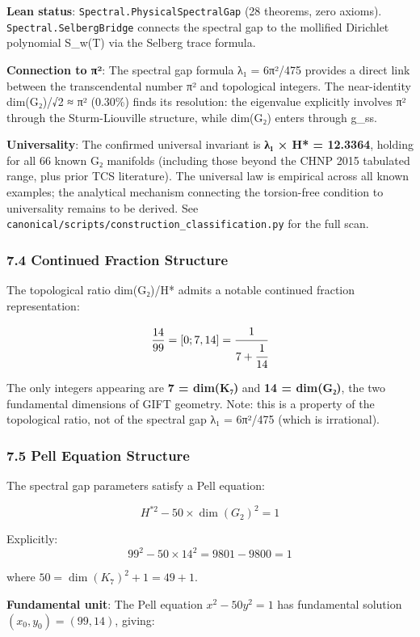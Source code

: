 \documentclass[11pt,a4paper]{article}
\begin{document}
{{{{{{{{{{{{{{{\textbf{Lean status}: \texttt{Spectral.PhysicalSpectralGap} (28 theorems, zero axioms). \texttt{Spectral.SelbergBridge} connects the spectral gap to the mollified Dirichlet polynomial S\_w(T) via the Selberg trace formula.

\textbf{Connection to π²}: The spectral gap formula λ₁ = 6π²/475 provides a direct link between the transcendental number π² and topological integers. The near-identity dim(G₂)/√2 ≈ π² (0.30\%) finds its resolution: the eigenvalue explicitly involves π² through the Sturm-Liouville structure, while dim(G₂) enters through g\_ss.

\textbf{Universality}: The confirmed universal invariant is \textbf{λ₁ × H* = 12.3364}, holding for all 66 known G₂ manifolds (including those beyond the CHNP 2015 tabulated range, plus prior TCS literature). The universal law is empirical across all known examples; the analytical mechanism connecting the torsion-free condition to universality remains to be derived. See \texttt{canonical/scripts/construction\_classification.py} for the full scan.

\subsubsection{7.4 Continued Fraction Structure}\label{continued-fraction-structure}

The topological ratio dim(G₂)/H* admits a notable continued fraction representation:

\[\frac{14}{99} = [0; 7, 14] = \cfrac{1}{7 + \cfrac{1}{14}}\]

The only integers appearing are \textbf{7 = dim(K₇)} and \textbf{14 = dim(G₂)}, the two fundamental dimensions of GIFT geometry. Note: this is a property of the topological ratio, not of the spectral gap λ₁ = 6π²/475 (which is irrational).

\subsubsection{7.5 Pell Equation Structure}\label{pell-equation-structure}

The spectral gap parameters satisfy a Pell equation:

\[\boxed{H^{*2} - 50 \times \dim(G_2)^2 = 1}\]

Explicitly:
\[99^2 - 50 \times 14^2 = 9801 - 9800 = 1\]

where \(50 = \dim(K_7)^2 + 1 = 49 + 1\).

\textbf{Fundamental unit}: The Pell equation \(x^2 - 50y^2 = 1\) has fundamental solution \((x_0, y_0) = (99, 14)\), giving:

}}}}}}}}}}}}}}}
\end{document}
